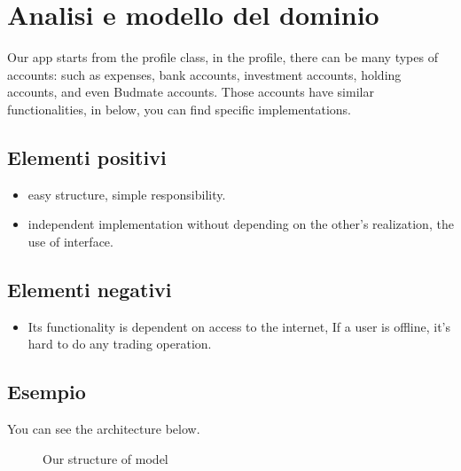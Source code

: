 \documentclass[a4paper,12pt]{report}
\begin{document}
\section{Analisi e modello del dominio}
Our app starts from the profile class, in the profile, there can be many types of accounts: 
such as expenses, bank accounts, investment accounts, holding accounts, and even Budmate accounts. Those accounts have similar functionalities, in below, you can find specific implementations.

\subsection*{Elementi positivi}
\begin{itemize}
	\item easy structure, simple responsibility.
	\item independent implementation without depending on the other's realization, the use of interface.
\end{itemize}

\subsection*{Elementi negativi}
\begin{itemize}
	\item Its functionality is dependent on access to the internet, If a user is offline, it's hard to do any trading operation.
\end{itemize}

\subsection*{Esempio}
You can see the architecture below.

\begin{figure}[H]
\centering{}
%
\caption{Our structure of model}
\label{img:domainAnalysis}
\end{figure}
\end{document}
